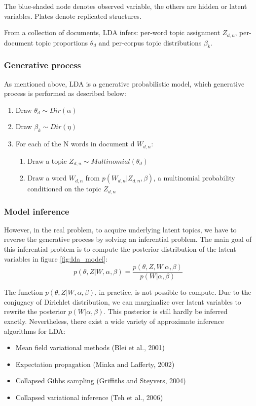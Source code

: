 \documentclass[11pt]{article}
\begin{document}
The blue-shaded node denotes observed variable, the others are hidden or latent variables. Plates denote replicated structures.

From a collection of documents, LDA infers: per-word topic assignment $Z_{d,n}$, per-document topic proportions $\theta_d$ and per-corpus topic distributions $\beta_k$.

\subsubsection{Generative process}

As mentioned above, LDA is a generative probabilistic model, which generative process is performed as described below:
\begin{enumerate}
	\item Draw $\theta_d \sim Dir(\alpha)$
	\item Draw $\beta_k \sim Dir(\eta)$
	\item For each of the N words in document d $W_{d,n}$:
	\begin{enumerate}
		\item Draw a topic $Z_{d,n} \sim Multinomial(\theta_d)$
		\item Draw a word $W_{d,n}$ from $p(W_{d,n}|Z_{d,n},\beta)$, a multinomial probability conditioned on the topic $Z_{d,n}$
	\end{enumerate}
\end{enumerate}

\subsubsection{Model inference}
However, in the real problem, to acquire underlying latent topics, we have to reverse the generative process by solving an inferential problem. The main goal of this inferential problem is to compute the posterior distribution of the latent variables in figure \ref{fig:lda_model}:
\[p(\theta,Z|W,\alpha,\beta)=\frac{p(\theta,Z,W|\alpha,\beta)}{p(W|\alpha,\beta)}\]

The function $p(\theta,Z|W,\alpha,\beta)$, in practice, is not possible to compute. Due to the conjugacy of Dirichlet distribution, we can marginalize over latent variables to rewrite the posterior $p(W|\alpha,\beta)$. This posterior is still hardly be inferred exactly. Nevertheless, there exist a wide variety of approximate inference algorithms for LDA:
\begin{itemize}
	\item Mean field variational methods \cite{blei2004variational} (Blei et al., 2001)
	\item Expectation propagation \cite{minka2002expectation} (Minka and Lafferty, 2002)
	\item Collapsed Gibbs sampling \cite{griffiths2004finding} (Griffiths and Steyvers, 2004)
	\item Collapsed variational inference \cite{teh2006collapsed} (Teh et al., 2006)
\end{itemize}
\end{document}
